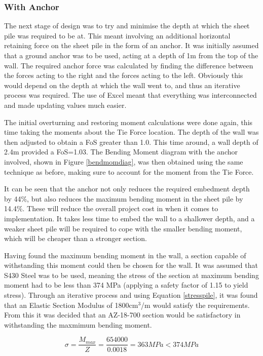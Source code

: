 \documentclass[12pt, a4paper]{article}
\begin{document}
\subsubsection{With Anchor}
\begin{justify}
The next stage of design was to try and minimise the depth at which the sheet pile was required to be at. This meant involving an additional horizontal retaining force on the sheet pile in the form of an anchor. It was initially assumed that a ground anchor was to be used, acting at a depth of 1m from the top of the wall. The required anchor force was calculated by finding the difference between the forces acting to the right and the forces acting to the left. Obviously this would depend on the depth at which the wall went to, and thus an iterative process was required. The use of Excel meant that everything was interconnected and made updating values much easier.
\begin{justify}
The initial overturning and restoring moment calculations were done again, this time taking the moments about the Tie Force location. The depth of the wall was then adjusted to obtain a FoS greater than 1.0. This time around, a wall depth of 2.4m provided a FoS=1.03. The Bending Moment diagram with the anchor involved, shown in Figure \ref{bendmomdiag}, was then obtained using the same technique as before, making sure to account for the moment from the Tie Force. 
\end{justify}
\begin{justify}
It can be seen that the anchor not only reduces the required embedment depth by 44\%, but also reduces the maximum bending moment in the sheet pile by 14.4\%. These will reduce the overall project cost in when it comes to implementation. It takes less time to embed the wall to a shallower depth, and a weaker sheet pile will be required to cope with the smaller bending moment, which will be cheaper than a stronger section. 
\end{justify}
\end{justify}
\begin{justify}
Having found the maximum bending moment in the wall, a section capable of withstanding this moment could then be chosen for the wall. It was assumed that S430 Steel was to be used, meaning the stress of the section at maximum bending moment had to be less than 374 MPa (applying a safety factor of 1.15 to yield stress). Through an iterative process and using Equation \ref{stresspile}, it was found that an Elastic Section Modulus of 1800cm$^3$/m would satisfy the requirements. From this it was decided that an AZ-18-700 section would be satisfactory in withstanding the maxmimum bending moment. 
\end{justify}
\begin{equation}
    \sigma=\frac{M_{max}}{Z}=\frac{654000}{0.0018}=363 MPa < 374 MPa
    \label{stresspile}
\end{equation}
\end{document}
